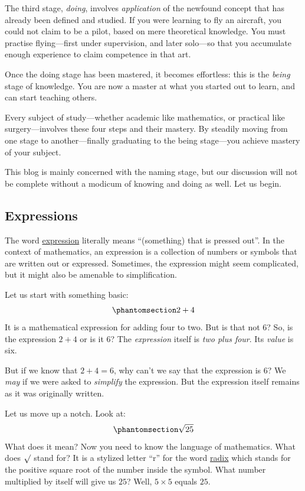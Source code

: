 \documentclass[
  a4paper,
]{article}
\begin{document}
The third stage, \emph{doing}, involves \emph{application} of the
newfound concept that has already been defined and studied. If you were
learning to fly an aircraft, you could not claim to be a pilot, based on
mere theoretical knowledge. You must practise flying---first under
supervision, and later solo---so that you accumulate enough experience
to claim competence in that art.

Once the doing stage has been mastered, it becomes effortless: this is
the \emph{being} stage of knowledge. You are now a master at what you
started out to learn, and can start teaching others.

Every subject of study---whether academic like mathematics, or practical
like surgery---involves these four steps and their mastery. By steadily
moving from one stage to another---finally graduating to the being
stage---you achieve mastery of your subject.

This blog is mainly concerned with the naming stage, but our discussion
will not be complete without a modicum of knowing and doing as well. Let
us begin.

\subsection{Expressions}\label{expressions}

The word
\href{https://www.etymonline.com/search?q=expression}{expression}
literally means ``(something) that is pressed out''. In the context of
mathematics, an expression is a collection of numbers or symbols that
are written out or expressed. Sometimes, the expression might seem
complicated, but it might also be amenable to simplification.

Let us start with something basic:
\begin{equation}\phantomsection\label{eq:two-plus-four}{
2 + 4
}\end{equation} It is a mathematical expression for adding four to two.
But is that not \(6\)? So, is the expression \(2 + 4\) or is it \(6\)?
The \emph{expression} itself is \emph{two plus four}. Its \emph{value}
is six.

But if we know that \(2 + 4 = 6\), why can't we say that the expression
is \(6\)? We \emph{may} if we were asked to \emph{simplify} the
expression. But the expression itself remains as it was originally
written.

Let us move up a notch. Look at:
\begin{equation}\phantomsection\label{eq:sqrt5}{
\sqrt{25}
}\end{equation} What does it mean? Now you need to know the language of
mathematics. What does \(\surd\) stand for? It is a stylized letter
``r'' for the word
\href{https://en.wikipedia.org/wiki/Square_root}{radix} which stands for
the positive square root of the number inside the symbol. What number
multiplied by itself will give us \(25\)? Well, \(5 \times 5\) equals
\(25\).
\end{document}
